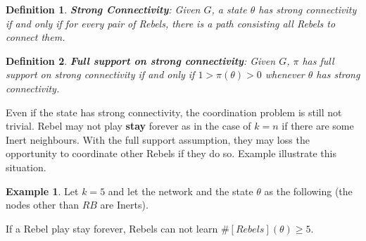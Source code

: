 \documentclass[12pt,letter]{article}
\newtheorem{definition}{Definition}[section]
\theoremstyle{definition}
\newtheorem{example}{Example}[section]
\theoremstyle{remark}
\theoremstyle{claim}
\begin{document}
\begin{definition}
\textbf{Strong Connectivity}: Given $G$, a state $\theta$ has strong connectivity if and only if for every pair of Rebels, there is a path consisting all Rebels to connect them.
\end{definition}  

\begin{definition}
\textbf{Full support on strong connectivity}: Given $G$, $\pi$ has full support on strong connectivity if and only if $1>\pi(\theta)>0$ whenever $\theta$ has strong connectivity.
\end{definition}  

Even if the state has strong connectivity, the coordination problem is still not trivial. Rebel may not play \textbf{stay} forever as in the case of $k=n$ if there are some Inert neighbours. With the full support assumption, they may loss the opportunity to coordinate other Rebels if they do so. Example illustrate this situation.

\begin{example}\label{ex_circle_number_5}
Let $k=5$ and let the network and the state $\theta$ as the following (the nodes other than $RB$ are Inerts).

\begin{center} 
\end{center} 

If a Rebel play stay forever, Rebels can not learn $\#[Rebels](\theta)\geq 5$. 
\end{example}
\end{document}
